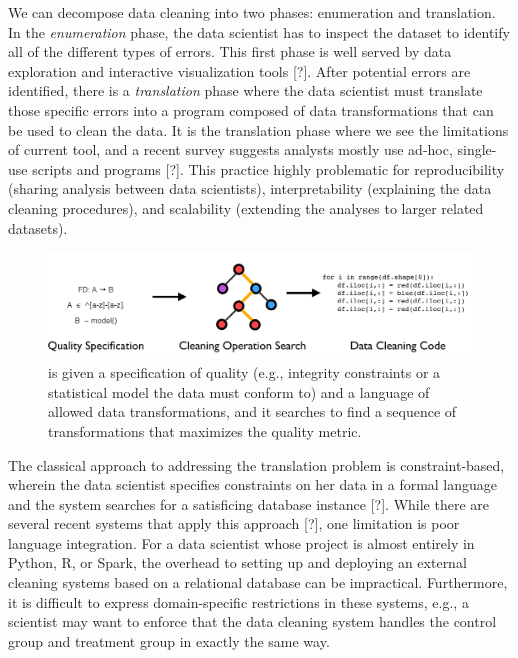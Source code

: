 We can decompose data cleaning into two phases: enumeration and translation. 
In the \emph{enumeration} phase, the data scientist has to inspect the dataset to identify all of the different types of errors.
This first phase is well served by data exploration and interactive visualization tools [?].
After potential errors are identified, there is a \emph{translation} phase where the data scientist must translate those specific errors into a program composed of data transformations that can be used to clean the data.
It is the translation phase where we see the limitations of current tool, and a recent survey suggests analysts mostly use ad-hoc, single-use scripts and programs [?]. 
This practice highly problematic for reproducibility (sharing analysis between data scientists), interpretability (explaining the  data cleaning procedures),  and  scalability (extending the analyses to larger related datasets).

\begin{figure}[t]
\centering
 \includegraphics[width=\columnwidth]{figures/intro.png}
 \caption{ \sys is given a specification of quality (e.g., integrity constraints or a statistical model the data must conform to) and a language  of  allowed  data  transformations,  and  it  searches  to find a sequence of transformations that maximizes the quality metric. }
\end{figure}

The classical approach to addressing the translation problem is constraint-based, wherein the data scientist specifies constraints on her data in a formal language and the system searches for a satisficing database instance [?].
While there are several recent systems that apply this approach [?], one limitation is poor language integration.
For a data scientist whose project is almost entirely in Python, R, or Spark, the overhead to setting up and deploying an external cleaning systems based on a relational database can be impractical.
Furthermore, it is difficult to express domain-specific restrictions in these systems, e.g., a scientist may want to enforce that the data cleaning system handles the control group and treatment group in exactly the same way.

